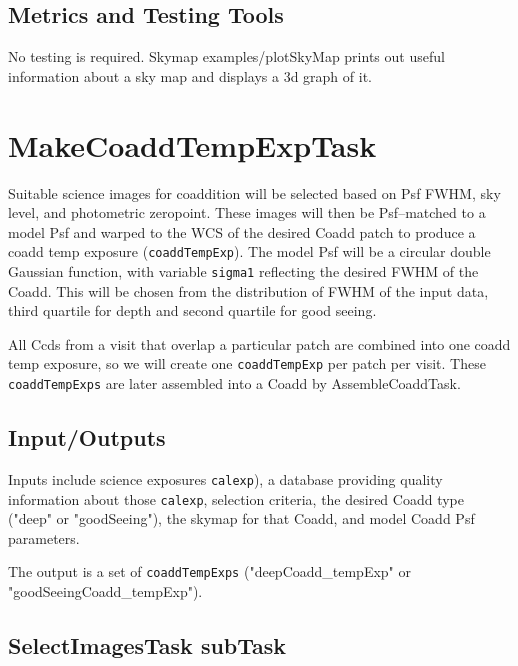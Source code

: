 \documentclass[prd, nofootinbib, floatfix, 11pt,tightenlines,times]{article}
\begin{document}

\subsection{Metrics and Testing Tools}

No testing is required.  Skymap examples/plotSkyMap prints out useful
information about a sky map and displays a 3d graph of it.


\section{MakeCoaddTempExpTask} 

Suitable science images for coaddition will be selected based on Psf
FWHM, sky level, and photometric zeropoint.  These images will then be
Psf--matched to a model Psf and warped to the WCS of the desired Coadd
patch to produce a coadd temp exposure ({\tt coaddTempExp}).  The
model Psf will be a circular double Gaussian function, with variable
{\tt sigma1} reflecting the desired FWHM of the Coadd.  This will be
chosen from the distribution of FWHM of the input data, third quartile
for depth and second quartile for good seeing.

All Ccds from a visit that overlap a particular patch are combined
into one coadd temp exposure, so we will create one {\tt coaddTempExp}
per patch per visit.  These {\tt coaddTempExps} are later assembled
into a Coadd by AssembleCoaddTask.

\subsection{Input/Outputs}

Inputs include science exposures {\tt calexp}), a database providing
quality information about those {\tt calexp}, selection criteria, the
desired Coadd type ("deep" or "goodSeeing"), the skymap for that
Coadd, and model Coadd Psf parameters.

The output is a set of {\tt coaddTempExps} ("deepCoadd\_tempExp" or
"goodSeeingCoadd\_tempExp").

\subsection{SelectImagesTask subTask} 
\end{document}
